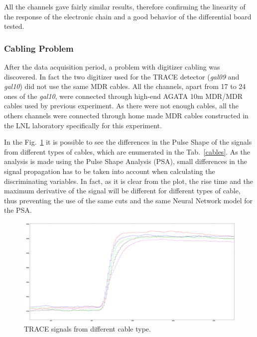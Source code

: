 \bigbreak

All the channels gave fairly similar results, therefore confirming the linearity of the response of the electronic chain and a good behavior of the differential board tested.

\subsubsection{Cabling Problem}

After the data acquisition period, a problem with digitizer cabling was
discovered. In fact the two digitizer used for the TRACE detector
(\textit{gal09} and \textit{gal10}) did not use the same MDR cables. All the
channels, apart from 17 to 24 ones of the \textit{gal10}, were connected through
high-end AGATA 10m MDR/MDR cables used by previous experiment. As there were
not enough cables, all the others channels were connected through home made
MDR cables constructed in the LNL laboratory specifically for this experiment.

\bigbreak

In the Fig.~\ref{cable} it is possible to see the differences in the Pulse
Shape of the signals from different types of cables, which are enumerated in
the Tab.~\ref{cables}. As the analysis is made using the Pulse Shape Analysis
(PSA), small differences in the signal propagation has to be taken into
account when calculating the discriminating variables. In fact, as it is clear
from the plot, the rise time and the maximum derivative of the signal will be
different for different types of cable, thus preventing the use of the same
cuts and the same Neural Network model for the PSA.

\bigbreak

\begin{figure}[h]
  \centering
  \includegraphics[scale=.16]{img/cabling.png}
  \caption{TRACE signals from different cable type.}
  \label{cable}
\end{figure}

